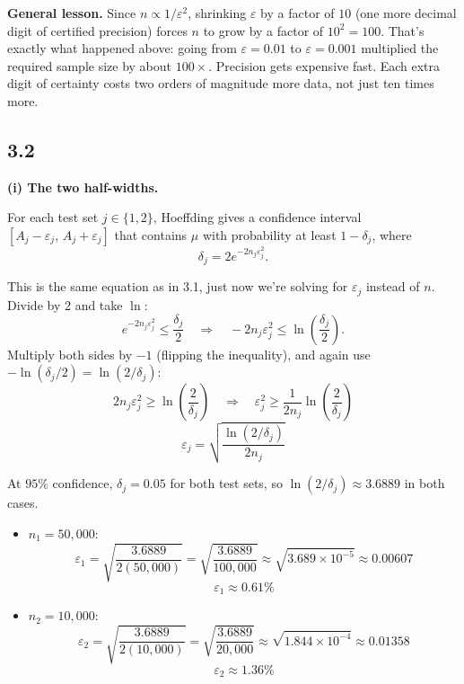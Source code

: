 \documentclass{article}
\begin{document}
\medskip
\noindent
\textbf{General lesson.} Since $n \propto 1/\varepsilon^2$, shrinking $\varepsilon$ by a
factor of $10$ (one more decimal digit of certified precision) forces $n$ to grow by a
factor of $10^2 = 100$. That's exactly what happened above: going from $\varepsilon=0.01$
to $\varepsilon=0.001$ multiplied the required sample size by about $100\times$. Precision
gets expensive fast. Each extra digit of certainty costs two orders of magnitude more
data, not just ten times more.

\subsection*{3.2}

\textbf{(i) The two half-widths.}

For each test set $j \in \{1,2\}$, Hoeffding gives a confidence interval
$[A_j-\varepsilon_j,\,A_j+\varepsilon_j]$ that contains $\mu$ with probability at least
$1-\delta_j$, where
\[
\delta_j = 2e^{-2n_j\varepsilon_j^2}.
\]

\medskip
\noindent
This is the same equation as in 3.1, just now we're solving for $\varepsilon_j$ instead of
$n$. Divide by 2 and take $\ln$:
\[
e^{-2n_j\varepsilon_j^2} \le \frac{\delta_j}{2}
\quad\Longrightarrow\quad
-2n_j\varepsilon_j^2 \le \ln\!\left(\frac{\delta_j}{2}\right).
\]
Multiply both sides by $-1$ (flipping the inequality), and again use $-\ln(\delta_j/2)=\ln(2/\delta_j)$:
\[
2n_j\varepsilon_j^2 \ge \ln\!\left(\frac{2}{\delta_j}\right)
\quad\Longrightarrow\quad
\varepsilon_j^2 \ge \frac{1}{2n_j}\ln\!\left(\frac{2}{\delta_j}\right)
\]
\[
\boxed{\varepsilon_j = \sqrt{\frac{\ln(2/\delta_j)}{2n_j}}}
\]

\medskip
\noindent
At $95\%$ confidence, $\delta_j = 0.05$ for both test sets, so $\ln(2/\delta_j) \approx 3.6889$ in both cases.

\begin{itemize}
    \item $n_1 = 50{,}000$:
    \[
    \varepsilon_1 = \sqrt{\frac{3.6889}{2(50{,}000)}} = \sqrt{\frac{3.6889}{100{,}000}} \approx \sqrt{3.689\times 10^{-5}} \approx 0.00607
    \]
    \[
    \boxed{\varepsilon_1 \approx 0.61\%}
    \]
    \item $n_2 = 10{,}000$:
    \[
    \varepsilon_2 = \sqrt{\frac{3.6889}{2(10{,}000)}} = \sqrt{\frac{3.6889}{20{,}000}} \approx \sqrt{1.844\times 10^{-4}} \approx 0.01358
    \]
    \[
    \boxed{\varepsilon_2 \approx 1.36\%}
    \]
\end{itemize}
\end{document}
